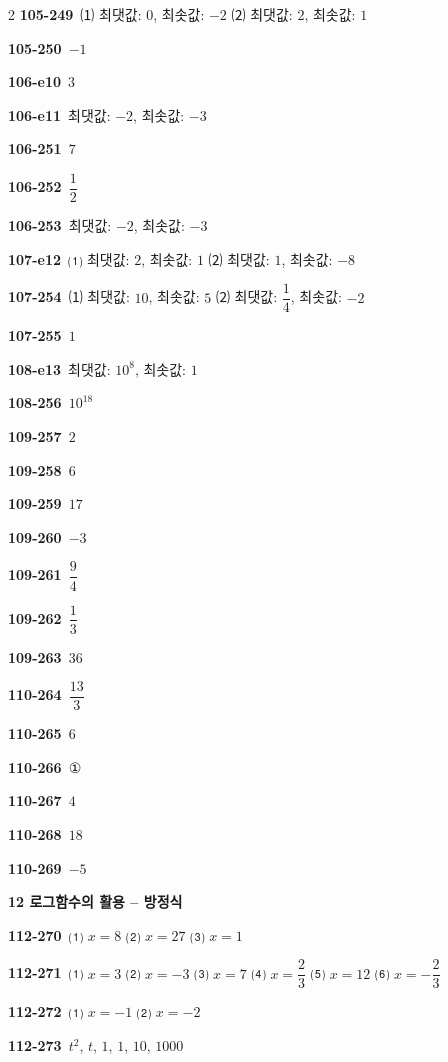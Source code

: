\documentclass[10pt,a4paper]{article}
\begin{document}
\begin{multicols}{2}
\noindent\textbf{105-249}\ ⑴ 최댓값: $0$, 최솟값: $-2$ ⑵ 최댓값: $2$, 최솟값: $1$\par
\noindent\textbf{105-250}\ $-1$\par
\noindent\textbf{106-e10}\ $3$\par
\noindent\textbf{106-e11}\ 최댓값: $-2$, 최솟값: $-3$\par
\noindent\textbf{106-251}\ $7$\par
\noindent\textbf{106-252}\ $\dfrac{1}{2}$\par
\noindent\textbf{106-253}\ 최댓값: $-2$, 최솟값: $-3$\par
\noindent\textbf{107-e12}\ ⑴ 최댓값: $2$, 최솟값: $1$ ⑵ 최댓값: $1$, 최솟값: $-8$\par
\noindent\textbf{107-254}\ ⑴ 최댓값: $10$, 최솟값: $5$ ⑵ 최댓값: $\dfrac{1}{4}$, 최솟값: $-2$\par
\noindent\textbf{107-255}\ $1$\par
\noindent\textbf{108-e13}\ 최댓값: $10^8$, 최솟값: $1$\par
\noindent\textbf{108-256}\ $10^{18}$\par
\noindent\textbf{109-257}\ $2$\par
\noindent\textbf{109-258}\ $6$\par
\noindent\textbf{109-259}\ $17$\par
\noindent\textbf{109-260}\ $-3$\par
\noindent\textbf{109-261}\ $\dfrac{9}{4}$\par
\noindent\textbf{109-262}\ $\dfrac{1}{3}$\par
\noindent\textbf{109-263}\ $36$\par
\noindent\textbf{110-264}\ $\dfrac{13}{3}$\par
\noindent\textbf{110-265}\ $6$\par
\noindent\textbf{110-266}\ ①\par
\noindent\textbf{110-267}\ $4$\par
\noindent\textbf{110-268}\ $18$\par
\noindent\textbf{110-269}\ $-5$\par
\noindent\textbf{12 로그함수의 활용 – 방정식}\par\smallskip
\noindent\textbf{112-270}\ ⑴ $x=8$ ⑵ $x=27$ ⑶ $x=1$\par
\noindent\textbf{112-271}\ ⑴ $x=3$ ⑵ $x=-3$ ⑶ $x=7$ ⑷ $x=\dfrac{2}{3}$ ⑸ $x=12$ ⑹ $x=-\dfrac{2}{3}$\par
\noindent\textbf{112-272}\ ⑴ $x=-1$ ⑵ $x=-2$\par
\noindent\textbf{112-273}\ $t^2$, $t$, $1$, $1$, $10$, $1000$\par

\end{multicols}
\end{document}
